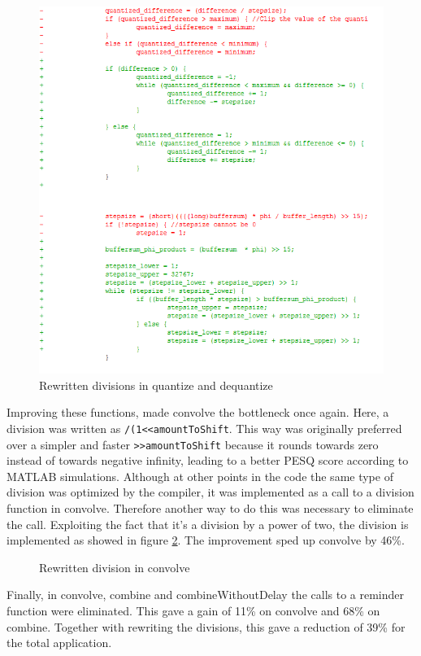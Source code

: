 \documentclass[a4paper]{article}
\begin{document}
\begin{figure}
\includegraphics[width=\textwidth]{new_divisions}
\caption{Rewritten divisions in quantize and dequantize}
\label{fig:new_divisions}
\end{figure}
Improving these functions, made convolve the bottleneck once again. Here, a division was written as \texttt{/(1<<amountToShift}. This way was originally preferred over a simpler and faster \texttt{>>amountToShift} because it rounds towards zero instead of towards negative infinity, leading to a better PESQ score according to MATLAB simulations. Although at other points in the code the same type of division was optimized by the compiler, it was implemented as a call to a division function in convolve. Therefore another way to do this was necessary to eliminate the call. Exploiting the fact that it's a division by a power of two, the division is implemented as showed in figure \ref{fig:new_division_in_convolve}. The improvement sped up convolve by 46\%.\\

\begin{figure}
\caption{Rewritten division in convolve}
\label{fig:new_division_in_convolve}
\end{figure}
Finally, in convolve, combine and combineWithoutDelay the calls to a reminder function were eliminated. This gave a gain of 11\% on convolve and 68\% on combine. Together with rewriting the divisions, this gave a reduction of 39\% for the total application.\\
\end{document}
